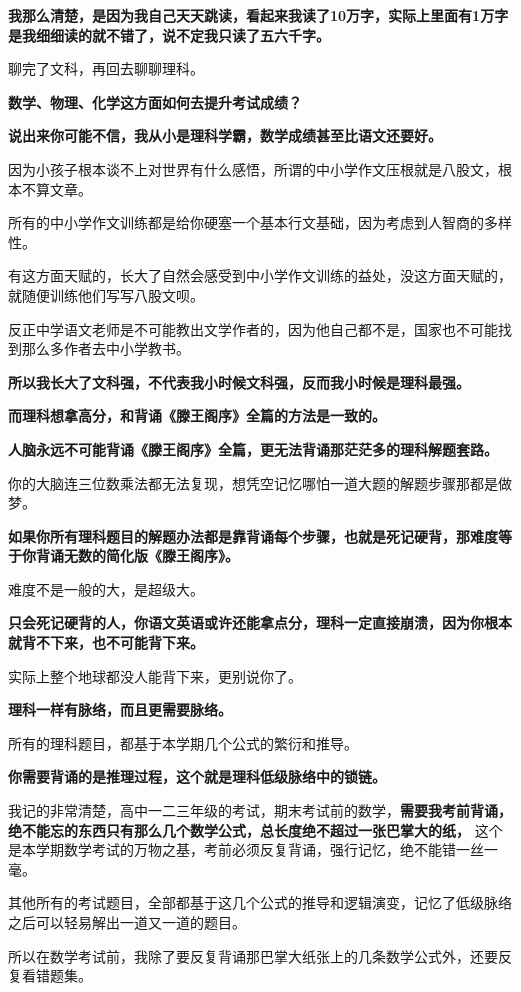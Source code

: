 \documentclass[UTF8, 11pt, oneside]{ctexart}
\newcommand{\zd}[1]{\textbf{\textcolor[RGB]{123,12,0}{#1}}} %
\begin{document}
\zd{我那么清楚，是因为我自己天天跳读，看起来我读了10万字，实际上里面有1万字是我细细读的就不错了，说不定我只读了五六千字。}

聊完了文科，再回去聊聊理科。

\zd{数学、物理、化学这方面如何去提升考试成绩？}

\zd{说出来你可能不信，我从小是理科学霸，数学成绩甚至比语文还要好。}

因为小孩子根本谈不上对世界有什么感悟，所谓的中小学作文压根就是八股文，根本不算文章。

所有的中小学作文训练都是给你硬塞一个基本行文基础，因为考虑到人智商的多样性。

有这方面天赋的，长大了自然会感受到中小学作文训练的益处，没这方面天赋的，就随便训练他们写写八股文呗。

反正中学语文老师是不可能教出文学作者的，因为他自己都不是，国家也不可能找到那么多作者去中小学教书。

\zd{所以我长大了文科强，不代表我小时候文科强，反而我小时候是理科最强。}

\zd{而理科想拿高分，和背诵《滕王阁序》全篇的方法是一致的。}

\zd{人脑永远不可能背诵《滕王阁序》全篇，更无法背诵那茫茫多的理科解题套路。}

你的大脑连三位数乘法都无法复现，想凭空记忆哪怕一道大题的解题步骤那都是做梦。

\zd{如果你所有理科题目的解题办法都是靠背诵每个步骤，也就是死记硬背，那难度等于你背诵无数的简化版《滕王阁序》。}

难度不是一般的大，是超级大。

\zd{只会死记硬背的人，你语文英语或许还能拿点分，理科一定直接崩溃，因为你根本就背不下来，也不可能背下来。}

实际上整个地球都没人能背下来，更别说你了。

\zd{理科一样有脉络，而且更需要脉络。}

所有的理科题目，都基于本学期几个公式的繁衍和推导。

\zd{你需要背诵的是推理过程，这个就是理科低级脉络中的锁链。}

我记的非常清楚，高中一二三年级的考试，期末考试前的数学，\zd{需要我考前背诵，绝不能忘的东西只有那么几个数学公式，总长度绝不超过一张巴掌大的纸，} 这个是本学期数学考试的万物之基，考前必须反复背诵，强行记忆，绝不能错一丝一毫。

其他所有的考试题目，全部都基于这几个公式的推导和逻辑演变，记忆了低级脉络之后可以轻易解出一道又一道的题目。

所以在数学考试前，我除了要反复背诵那巴掌大纸张上的几条数学公式外，还要反复看错题集。
\end{document}
